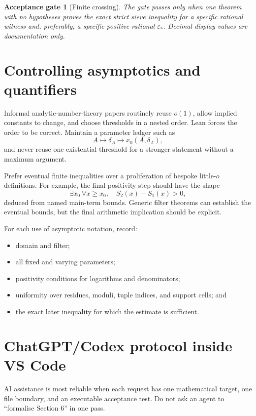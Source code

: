 \documentclass[11pt]{article}
\newtheorem{gate}{Acceptance gate}
\begin{document}
\begin{gate}[Finite crossing]
The gate passes only when one theorem with no hypotheses proves the exact
strict sieve inequality for a specific rational witness and, preferably, a
specific positive rational \(\varepsilon_*\).  Decimal display values are
documentation only.
\end{gate}

\section{Controlling asymptotics and quantifiers}

Informal analytic-number-theory papers routinely reuse \(o(1)\), allow implied
constants to change, and choose thresholds in a nested order.  Lean forces the
order to be correct.  Maintain a parameter ledger such as
\[
 A\longmapsto \delta_A\longmapsto x_0(A,\delta_A),
\]
and never reuse one existential threshold for a stronger statement without a
maximum argument.

Prefer eventual finite inequalities over a proliferation of bespoke
little-\(o\) definitions.  For example, the final positivity step should have
the shape
\[
 \exists x_0\ \forall x\geq x_0,
 \quad S_2(x)-S_1(x)>0,
\]
deduced from named main-term bounds.  Generic filter theorems can establish the
eventual bounds, but the final arithmetic implication should be explicit.

For each use of asymptotic notation, record:
\begin{itemize}
\item domain and filter;
\item all fixed and varying parameters;
\item positivity conditions for logarithms and denominators;
\item uniformity over residues, moduli, tuple indices, and support cells; and
\item the exact later inequality for which the estimate is sufficient.
\end{itemize}

\section{ChatGPT/Codex protocol inside VS Code}

AI assistance is most reliable when each request has one mathematical target,
one file boundary, and an executable acceptance test.  Do not ask an agent to
``formalise Section 6'' in one pass.
\end{document}
